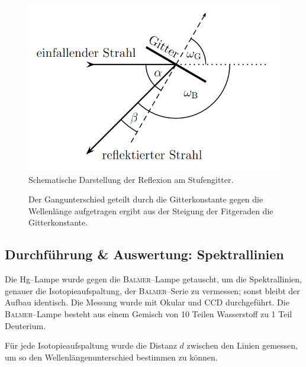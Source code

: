 \documentclass[sn-mathphys-num,iicol]{sn-jnl}
\theoremstyle{thmstyleone}
\theoremstyle{thmstyletwo}
\theoremstyle{thmstylethree}
\begin{document}
\begin{figure}[t]
        \centering
        \includegraphics[width=.5\textwidth]{402_reflexion.png}
        \caption{Schematische Darstellung der Reflexion am Stufengitter.\cite{Anleitung402}} \label{fig:strahlengang}
\end{figure}
\begin{figure}[t] 
        \centering
        \resizebox{.5\textwidth}{!}{}
        \caption{Der Gangunterschied geteilt durch die Gitterkonstante gegen die Wellenlänge aufgetragen ergibt aus der Steigung der Fitgeraden die Gitterkonstante.} \label{fig:gitterkonstante}
\end{figure}

\subsection{Durchführung \& Auswertung: Spektrallinien}
Die Hg--Lampe wurde gegen die \textsc{Balmer}--Lampe getauscht, um die Spektrallinien, genauer die Isotopieaufspaltung, der \textsc{Balmer}--Serie zu vermessen; sonst bleibt der Aufbau identisch.
Die Messung wurde mit Okular und CCD durchgeführt.
Die \textsc{Balmer}--Lampe besteht aus einem Gemisch von 10 Teilen Wasserstoff zu 1 Teil Deuterium.

Für jede Isotopieaufspaltung wurde die Distanz $d$ zwischen den Linien gemessen, um so den Wellenlängenunterschied bestimmen zu können.
\end{document}
